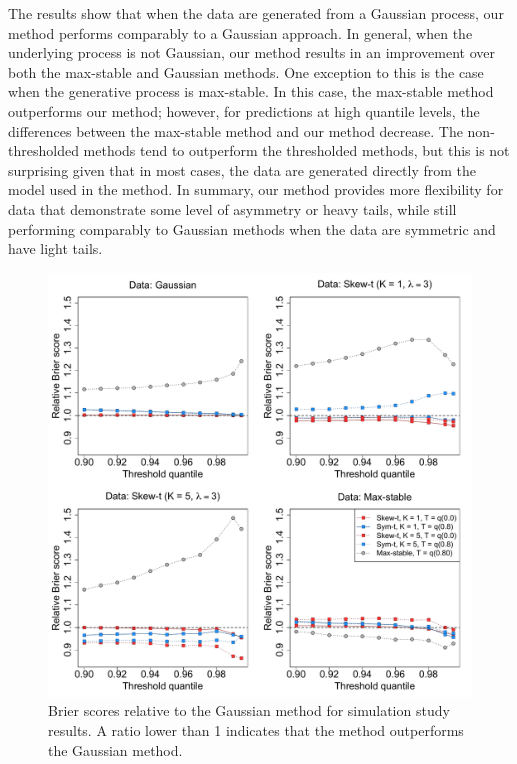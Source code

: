 \documentclass[useAMS,usenatbib,referee]{biom}
\begin{document}
The results show that when the data are generated from a Gaussian process, our method performs comparably to a Gaussian approach.
In general, when the underlying process is not Gaussian, our method results in an improvement over both the max-stable and Gaussian methods.
One exception to this is the case when the generative process is max-stable.
In this case, the max-stable method outperforms our method; however, for predictions at high quantile levels, the differences between the max-stable method and our method decrease.
The non-thresholded methods tend to outperform the thresholded methods, but this is not surprising given that in most cases, the data are generated directly from the model used in the method.
In summary, our method provides more flexibility for data that demonstrate some level of asymmetry or heavy tails, while still performing comparably to Gaussian methods when the data are symmetric and have light tails.

\begin{figure}
  \includegraphics[width=\linewidth]{plots/bsplots-mean.pdf}
  \caption{Brier scores relative to the Gaussian method for simulation study results. A ratio lower than 1 indicates that the method outperforms the Gaussian method.}
  \label{fig:simbrierscores}
\end{figure}
\end{document}
